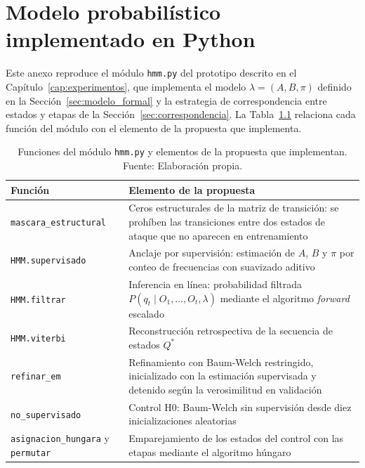 \chapter{Modelo probabilístico implementado en Python}
\label{anx:modelo}
Este anexo reproduce el módulo \texttt{hmm.py} del prototipo descrito en el Capítulo~\ref{cap:experimentos}, que implementa el modelo $\lambda = (A, B, \pi)$ definido en la Sección~\ref{sec:modelo_formal} y la estrategia de correspondencia entre estados y etapas de la Sección~\ref{sec:correspondencia}. La Tabla~\ref{tab:anexo_funciones} relaciona cada función del módulo con el elemento de la propuesta que implementa.

\begin{table}[h!]
\centering
\small
\renewcommand{\arraystretch}{1.25}
\begin{tabularx}{\textwidth}{|>{\raggedright\arraybackslash}p{4.6cm}|>{\raggedright\arraybackslash}X|}
\hline
\textbf{Función} & \textbf{Elemento de la propuesta} \\ \hline
\texttt{mascara\_estructural} & Ceros estructurales de la matriz de transición: se prohíben las transiciones entre dos estados de ataque que no aparecen en entrenamiento \\ \hline
\texttt{HMM.supervisado} & Anclaje por supervisión: estimación de $A$, $B$ y $\pi$ por conteo de frecuencias con suavizado aditivo \\ \hline
\texttt{HMM.filtrar} & Inferencia en línea: probabilidad filtrada $P(q_t \mid O_1, \dots, O_t, \lambda)$ mediante el algoritmo \textit{forward} escalado \\ \hline
\texttt{HMM.viterbi} & Reconstrucción retrospectiva de la secuencia de estados $Q^*$ \\ \hline
\texttt{refinar\_em} & Refinamiento con Baum-Welch restringido, inicializado con la estimación supervisada y detenido según la verosimilitud en validación \\ \hline
\texttt{no\_supervisado} & Control H0: Baum-Welch sin supervisión desde diez inicializaciones aleatorias \\ \hline
\texttt{asignacion\_hungara} y \texttt{permutar} & Emparejamiento de los estados del control con las etapas mediante el algoritmo húngaro \\ \hline
\end{tabularx}
\caption{Funciones del módulo \texttt{hmm.py} y elementos de la propuesta que implementan. Fuente: Elaboración propia.}
\label{tab:anexo_funciones}
\end{table}
\FloatBarrier

